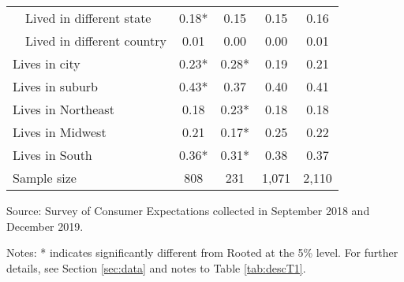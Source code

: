 \begin{table}[ht]
\begin{threeparttable}
\begin{tabular}{lcccc}
~~Lived in different state                & 0.18* & 0.15 & 0.15 & 0.16 \\ 
~~Lived in different country              & 0.01 & 0.00 & 0.00 & 0.01 \\ 
Lives in city                             & 0.23* & 0.28* & 0.19 & 0.21 \\ 
Lives in suburb                           & 0.43* & 0.37 & 0.40 & 0.41 \\ 
Lives in Northeast                        & 0.18 & 0.23* & 0.18 & 0.18 \\ 
Lives in Midwest                          & 0.21 & 0.17* & 0.25 & 0.22 \\ 
Lives in South                            & 0.36* & 0.31* & 0.38 & 0.37 \\ 
\midrule 
Sample size                      &   808 &   231 & 1,071 & 2,110 \\ 
\bottomrule 
\end{tabular} 
\footnotesize{Source: Survey of Consumer Expectations collected in September 2018 and December 2019. 
 
\bigskip{} 
 
Notes: * indicates significantly different from Rooted at the 5\% level. For further details, see Section \ref{sec:data} and notes to Table \ref{tab:descT1}.}
\end{threeparttable} 
\end{table} 
